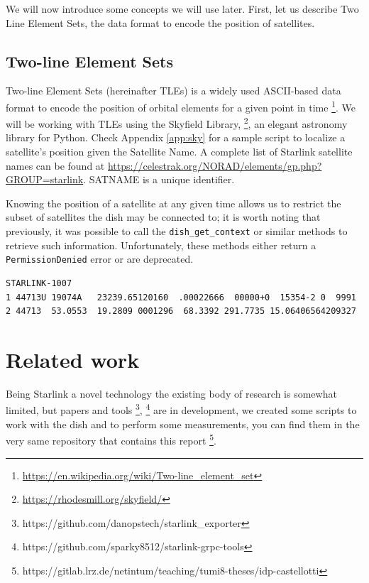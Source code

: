 \documentclass[IN,11pt,twoside,openright,idp,english]{tumthesis}
\begin{document}
We will now introduce some concepts we will use later. First, let us describe Two Line Element Sets, the data format to encode the position of satellites.

\subsection{Two-line Element Sets}

Two-line Element Sets (hereinafter TLEs) is a widely used ASCII-based data format to encode the position of orbital elements for a given point in time \footnote{\url{https://en.wikipedia.org/wiki/Two-line_element_set}}. We will be working with TLEs using the Skyfield Library, \footnote{\url{https://rhodesmill.org/skyfield/}}, an elegant astronomy library for Python. Check Appendix \ref{app:sky} for a sample script to localize a satellite's position given the Satellite Name. A complete list of Starlink satellite names can be found at \url{https://celestrak.org/NORAD/elements/gp.php?GROUP=starlink}. SATNAME is a unique identifier.

Knowing the position of a satellite at any given time allows us to restrict the subset of satellites the dish may be connected to; it is worth noting that previously, it was possible to call the \texttt{dish\_get\_context} or similar methods to retrieve such information. Unfortunately, these methods either return a \texttt{PermissionDenied} error or are deprecated.

\begin{lstlisting}[caption={TLE for satellite STARLINK-1007 },captionpos=b]
STARLINK-1007           
1 44713U 19074A   23239.65120160  .00022666  00000+0  15354-2 0  9991
2 44713  53.0553  19.2809 0001296  68.3392 291.7735 15.06406564209327
\end{lstlisting}

  
\section{Related work}

Being Starlink a novel technology the existing body of research is somewhat limited, but papers and tools \footnote{https://github.com/danopstech/starlink\_exporter}, \footnote{https://github.com/sparky8512/starlink-grpc-tools} are in development, we created some scripts to work with the dish and to perform some measurements, you can find them in the very same repository that contains this report \footnote{https://gitlab.lrz.de/netintum/teaching/tumi8-theses/idp-castellotti}.
\end{document}
